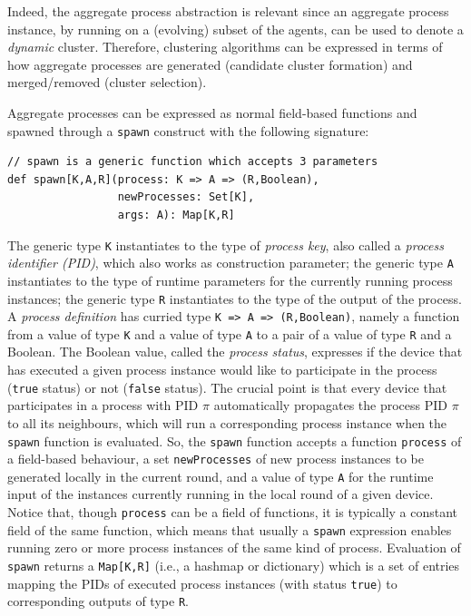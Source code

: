 Indeed, the aggregate process abstraction
 is relevant since an aggregate process instance,
 by running on a (evolving) subset of the agents,
 can be used to denote a \emph{dynamic} cluster.
%
Therefore, clustering algorithms
 can be expressed in terms of how
 aggregate processes are generated (candidate cluster formation)
 and
 merged/removed (cluster selection).

Aggregate processes can be expressed as normal field-based functions and spawned through a \lstinline|spawn| construct
 with the following signature:
%
\begin{lstlisting}
// spawn is a generic function which accepts 3 parameters
def spawn[K,A,R](process: K => A => (R,Boolean),
                 newProcesses: Set[K],
                 args: A): Map[K,R]
\end{lstlisting}
%
The generic type \lstinline|K| instantiates to the type of \emph{process key}, 
 also called a \emph{process identifier (PID)}, which also works as construction parameter;
 the generic type \lstinline|A| instantiates to the type of runtime parameters for the currently running process instances;
 the generic type \lstinline|R| instantiates to the type of the output of the process.
%
A \emph{process definition} has curried type \lstinline|K => A => (R,Boolean)|, 
namely a function from a value of type \lstinline|K| and a value of type \lstinline|A| to a pair of a value of type \lstinline|R| and a Boolean.
%
The Boolean value, called the \emph{process status}, 
 expresses if the device that has executed a given process instance
 would like to participate in the process (\lstinline|true| status)
 or not (\lstinline|false| status).
%
The crucial point is that every device that participates in a process with PID $\pi$ automatically propagates the process PID $\pi$ to all its neighbours, 
which will run a corresponding process instance when the \lstinline|spawn| function is evaluated.
%
So, the \lstinline|spawn| function accepts a function \lstinline|process| of a field-based behaviour,
 a set \lstinline|newProcesses| of new process instances to be generated locally in the current round,
 and a value of type \lstinline|A| for the runtime input of the instances currently running in the local round of a given device.
%
Notice that, though \lstinline|process| can be a field of functions, 
 it is typically a constant field of the same function, 
 which means that usually a \lstinline|spawn| expression enables running zero or more process instances of the same kind of process.
%
Evaluation of \lstinline|spawn| returns a \lstinline|Map[K,R]|
 (i.e., a hashmap or dictionary) which is a set of entries
 mapping the PIDs of executed process instances (with status \lstinline|true|) to corresponding outputs of type \lstinline|R|.
%


